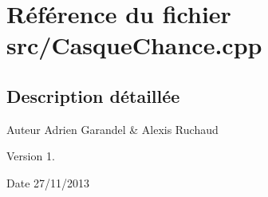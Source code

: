 \section{Référence du fichier src/\-Casque\-Chance.cpp}
\label{_casque_chance_8cpp}


\subsection{Description détaillée}
\begin{DoxyAuthor}{Auteur}
Adrien Garandel \& Alexis Ruchaud 
\end{DoxyAuthor}
\begin{DoxyVersion}{Version}
1. 
\end{DoxyVersion}
\begin{DoxyDate}{Date}
27/11/2013 
\end{DoxyDate}
